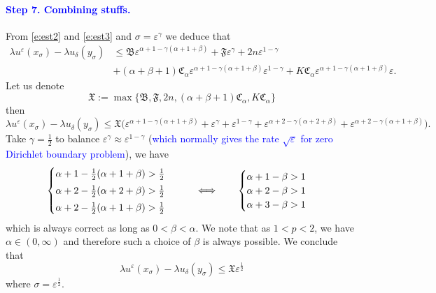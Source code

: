 \documentclass[11pt,reqno]{amsart}
\numberwithin{figure}{section}
\theoremstyle{plain}
\theoremstyle{remark}
\numberwithin{equation}{section}
\begin{document}
\paragraph{\textcolor{blue}{\textbf{Step 7. Combining stuffs.}}} From \eqref{e:est2} and \eqref{e:est3} and $\sigma = \varepsilon^\gamma$ we deduce that
\begin{align*}
    \lambda u^\varepsilon(x_\sigma) - \lambda u_\delta(y_\sigma) &\leq   \mathfrak{B}\varepsilon^{\alpha+1 - \gamma(\alpha+1+\beta)}+ \mathfrak{F}\varepsilon^\gamma + 2n \varepsilon^{1-\gamma}\\
    & + (\alpha+\beta + 1)\mathfrak{C}_\alpha \varepsilon^{\alpha+1 - \gamma(\alpha+1+\beta)} \varepsilon^{1-\gamma} + K\mathfrak{C}_\alpha\varepsilon^{\alpha+1 - \gamma(\alpha+1+\beta)} \varepsilon.
\end{align*}
Let us denote
\begin{equation*}
    \mathfrak{X}:= \max\Big\lbrace \mathfrak{B}, \mathfrak{F},2n, (\alpha+\beta+1)\mathfrak{C}_\alpha, K\mathfrak{C}_\alpha \Big\rbrace
\end{equation*}
then
\begin{equation*}
    \lambda u^\varepsilon(x_\sigma) - \lambda u_\delta(y_\sigma) \leq \mathfrak{X}\Big(\varepsilon^{\alpha+1-\gamma(\alpha+1+\beta)}+\varepsilon^\gamma+\varepsilon^{1-\gamma} + \varepsilon^{\alpha+2-\gamma(\alpha+2+\beta)}+\varepsilon^{\alpha+2-\gamma(\alpha+1+\beta)}\Big).
\end{equation*}
Take $\gamma = \frac{1}{2}$ to balance $\varepsilon^\gamma \approx \varepsilon^{1-\gamma}$ (\textcolor{blue}{which normally gives the rate $\sqrt{\varepsilon}$ for zero Dirichlet boundary problem}), we have
\begin{equation*}
    \begin{cases}
    \alpha+1 - \frac{1}{2}(\alpha+1+\beta) > \frac{1}{2}\vspace{3pt}\\
    \alpha+2 - \frac{1}{2}(\alpha+2+\beta) > \frac{1}{2}\vspace{3pt}\\
    \alpha+2 - \frac{1}{2}(\alpha+1+\beta) > \frac{1}{2}
    \end{cases} \qquad\Longleftrightarrow\qquad \begin{cases}
    \alpha+1-\beta > 1\\
    \alpha+2-\beta > 1\\
    \alpha+3-\beta > 1
    \end{cases}
\end{equation*}
which is always correct as long as $0 < \beta < \alpha$. We note that as $1<p<2$, we have $\alpha\in (0,\infty)$ and therefore such a choice of $\beta$ is always possible. We conclude that
\begin{equation}\label{e:crucial}
    \lambda u^\varepsilon(x_\sigma) - \lambda u_\delta(y_\sigma) \leq \mathfrak{X}\varepsilon^\frac{1}{2}
\end{equation}
where $\sigma = \varepsilon^\frac{1}{2}$. 
\end{document}
